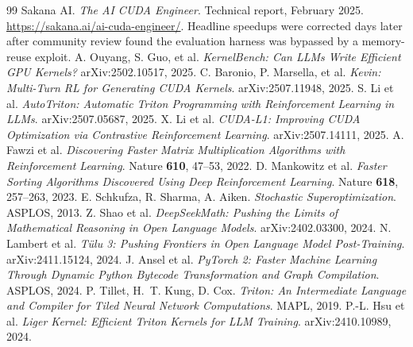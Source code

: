 \documentclass[10pt]{article}
\begin{document}
\begin{thebibliography}{99}\small
{} Sakana AI. \emph{The AI CUDA Engineer}. Technical report,
February 2025. \url{https://sakana.ai/ai-cuda-engineer/}. Headline speedups were corrected
days later after community review found the evaluation harness was bypassed by a
memory-reuse exploit.
 A. Ouyang, S. Guo, et al. \emph{KernelBench: Can LLMs Write
Efficient GPU Kernels?} arXiv:2502.10517, 2025.
 C. Baronio, P. Marsella, et al. \emph{Kevin: Multi-Turn RL for Generating
CUDA Kernels}. arXiv:2507.11948, 2025.
 S. Li et al. \emph{AutoTriton: Automatic Triton Programming with
Reinforcement Learning in LLMs}. arXiv:2507.05687, 2025.
 X. Li et al. \emph{CUDA-L1: Improving CUDA Optimization via Contrastive
Reinforcement Learning}. arXiv:2507.14111, 2025.
 A. Fawzi et al. \emph{Discovering Faster Matrix Multiplication
Algorithms with Reinforcement Learning}. Nature \textbf{610}, 47--53, 2022.
 D. Mankowitz et al. \emph{Faster Sorting Algorithms Discovered Using
Deep Reinforcement Learning}. Nature \textbf{618}, 257--263, 2023.
 E. Schkufza, R. Sharma, A. Aiken. \emph{Stochastic Superoptimization}.
ASPLOS, 2013.
 Z. Shao et al. \emph{DeepSeekMath: Pushing the Limits of
Mathematical Reasoning in Open Language Models}. arXiv:2402.03300, 2024.
 N. Lambert et al. \emph{T\"ulu 3: Pushing Frontiers in Open Language
Model Post-Training}. arXiv:2411.15124, 2024.
 J. Ansel et al. \emph{PyTorch 2: Faster Machine Learning Through
Dynamic Python Bytecode Transformation and Graph Compilation}. ASPLOS, 2024.
 P. Tillet, H.~T. Kung, D. Cox. \emph{Triton: An Intermediate Language
and Compiler for Tiled Neural Network Computations}. MAPL, 2019.
 P.-L. Hsu et al. \emph{Liger Kernel: Efficient Triton Kernels for LLM
Training}. arXiv:2410.10989, 2024.
\end{thebibliography}
\end{document}
